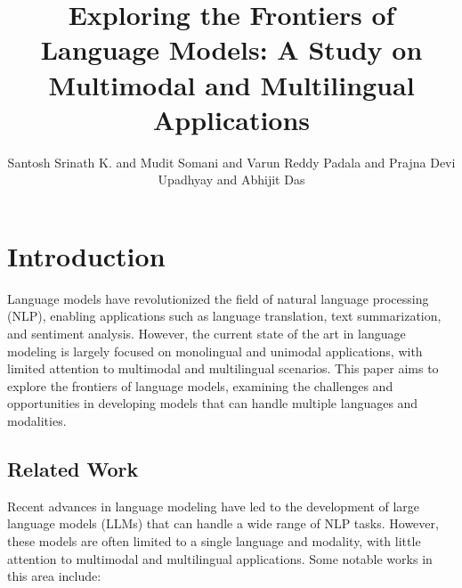 \documentclass{article}
\begin{document}
\title{Exploring the Frontiers of Language Models: A Study on Multimodal and Multilingual Applications}

\author{Santosh Srinath K. and Mudit Somani and Varun Reddy Padala and Prajna Devi Upadhyay and Abhijit Das}

\maketitle


\section{Introduction}

Language models have revolutionized the field of natural language processing (NLP), enabling applications such as language translation, text summarization, and sentiment analysis. However, the current state of the art in language modeling is largely focused on monolingual and unimodal applications, with limited attention to multimodal and multilingual scenarios. This paper aims to explore the frontiers of language models, examining the challenges and opportunities in developing models that can handle multiple languages and modalities.

\subsection{Related Work}

Recent advances in language modeling have led to the development of large language models (LLMs) that can handle a wide range of NLP tasks. However, these models are often limited to a single language and modality, with little attention to multimodal and multilingual applications. Some notable works in this area include:
\end{document}
